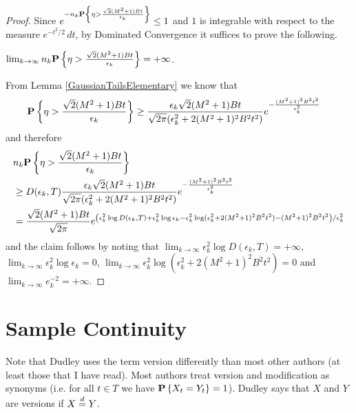 \begin{proof}
Since $e^{-n_k \textbf{P}\left \{\eta > \frac{\sqrt{2}(M^2+1)Bt}{\epsilon_k} \right \}} \leq 1$ and $1$ is integrable with respect to the measure $e^{-t^2/2} \, dt$, by Dominated Convergence it suffices to prove the following.
\begin{clm}$\lim_{k \to \infty} n_k \textbf{P}\left \{\eta > \frac{\sqrt{2}(M^2+1)Bt}{\epsilon_k} \right \} = +\infty$.
\end{clm}
From Lemma \ref{GaussianTailsElementary} we know that 
\begin{align*}
\textbf{P}\left \{\eta > \frac{\sqrt{2}(M^2+1)Bt}{\epsilon_k} \right \}
&\geq \frac{\epsilon_k \sqrt{2}(M^2+1)Bt}{\sqrt{2\pi} (\epsilon_k^2 + 2(M^2+1)^2B^2t^2)} e^{-\frac{(M^2+1)^2B^2t^2}{\epsilon^2_k}}
\end{align*}
and therefore
\begin{align*}
&n_k \textbf{P}\left \{\eta > \frac{\sqrt{2}(M^2+1)Bt}{\epsilon_k} \right \} \\
&\geq D(\epsilon_k, T) \frac{\epsilon_k \sqrt{2}(M^2+1)Bt}{\sqrt{2\pi} (\epsilon_k^2 + 2(M^2+1)^2B^2t^2)} e^{-\frac{(M^2+1)^2B^2t^2}{\epsilon^2_k}} \\
&= \frac{\sqrt{2}(M^2+1)Bt}{\sqrt{2\pi}} e^{\left( \epsilon_k^2 \log D(\epsilon_k, T) +  \epsilon_k^2 \log \epsilon_k -  \epsilon_k^2 \log (\epsilon_k^2 + 2(M^2+1)^2B^2t^2) -(M^2+1)^2B^2t^2\right)/\epsilon^2_k} \\
\end{align*}
and the claim follows by noting that $\lim_{k \to \infty} \epsilon_k^2 \log D(\epsilon_k, T) = +\infty$, $\lim_{k \to \infty} \epsilon_k^2 \log \epsilon_k =0$, 
$\lim_{k \to \infty} \epsilon_k^2 \log (\epsilon_k^2 + 2(M^2+1)^2B^2t^2) =0$ and $\lim_{k \to \infty} e_k^{-2} = +\infty$.
\end{proof}
\section{Sample Continuity}

Note that Dudley uses the term version differently than most other authors (at least those that I have read).  Most authors treat version and modification as synonyms (i.e. for all $t \in T$ we have $\textbf{P}\left \{X_t = Y_t \right \}=1$).  Dudley says that $X$ and $Y$ are versions if $X \overset{d}= Y$.

